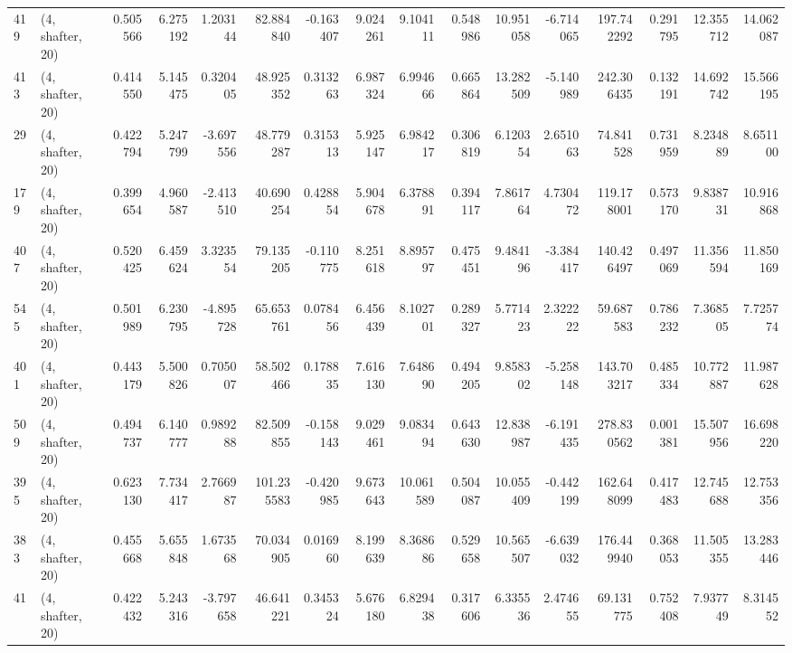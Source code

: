 \begin{tabular}{llrrrrrrrrrrrrrr}
419 &  (4, shafter, 20) &   0.505566 &   6.275192 &   1.203144 &    82.884840 &  -0.163407 &   9.024261 &   9.104111 &  0.548986 &  10.951058 &  -6.714065 &    197.742292 &   0.291795 &  12.355712 &   14.062087 \\
413 &  (4, shafter, 20) &   0.414550 &   5.145475 &   0.320405 &    48.925352 &   0.313263 &   6.987324 &   6.994666 &  0.665864 &  13.282509 &  -5.140989 &    242.306435 &   0.132191 &  14.692742 &   15.566195 \\
29  &  (4, shafter, 20) &   0.422794 &   5.247799 &  -3.697556 &    48.779287 &   0.315313 &   5.925147 &   6.984217 &  0.306819 &   6.120354 &   2.651063 &     74.841528 &   0.731959 &   8.234889 &    8.651100 \\
179 &  (4, shafter, 20) &   0.399654 &   4.960587 &  -2.413510 &    40.690254 &   0.428854 &   5.904678 &   6.378891 &  0.394117 &   7.861764 &   4.730472 &    119.178001 &   0.573170 &   9.838731 &   10.916868 \\
407 &  (4, shafter, 20) &   0.520425 &   6.459624 &   3.323554 &    79.135205 &  -0.110775 &   8.251618 &   8.895797 &  0.475451 &   9.484196 &  -3.384417 &    140.426497 &   0.497069 &  11.356594 &   11.850169 \\
545 &  (4, shafter, 20) &   0.501989 &   6.230795 &  -4.895728 &    65.653761 &   0.078456 &   6.456439 &   8.102701 &  0.289327 &   5.771423 &   2.322222 &     59.687583 &   0.786232 &   7.368505 &    7.725774 \\
401 &  (4, shafter, 20) &   0.443179 &   5.500826 &   0.705007 &    58.502466 &   0.178835 &   7.616130 &   7.648690 &  0.494205 &   9.858302 &  -5.258148 &    143.703217 &   0.485334 &  10.772887 &   11.987628 \\
509 &  (4, shafter, 20) &   0.494737 &   6.140777 &   0.989288 &    82.509855 &  -0.158143 &   9.029461 &   9.083494 &  0.643630 &  12.838987 &  -6.191435 &    278.830562 &   0.001381 &  15.507956 &   16.698220 \\
395 &  (4, shafter, 20) &   0.623130 &   7.734417 &   2.766987 &   101.235583 &  -0.420985 &   9.673643 &  10.061589 &  0.504087 &  10.055409 &  -0.442199 &    162.648099 &   0.417483 &  12.745688 &   12.753356 \\
383 &  (4, shafter, 20) &   0.455668 &   5.655848 &   1.673568 &    70.034905 &   0.016960 &   8.199639 &   8.368686 &  0.529658 &  10.565507 &  -6.639032 &    176.449940 &   0.368053 &  11.505355 &   13.283446 \\
41  &  (4, shafter, 20) &   0.422432 &   5.243316 &  -3.797658 &    46.641221 &   0.345324 &   5.676180 &   6.829438 &  0.317606 &   6.335536 &   2.474655 &     69.131775 &   0.752408 &   7.937749 &    8.314552 \\

\end{tabular}
